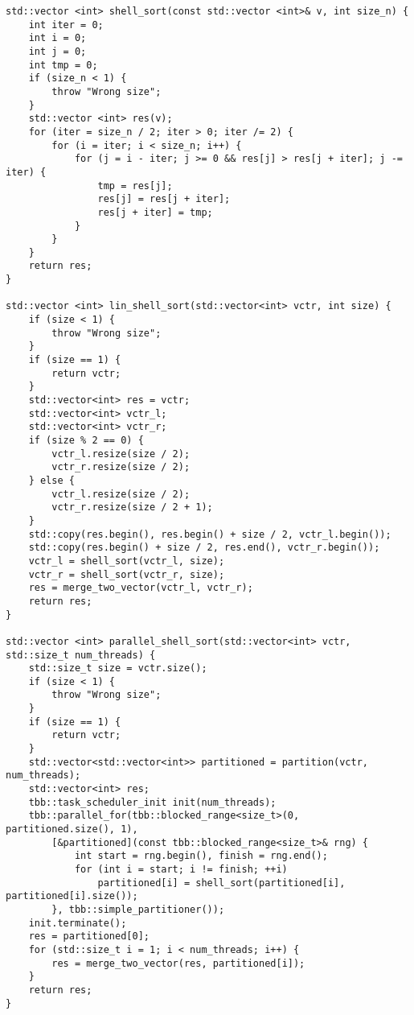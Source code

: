 \documentclass{report}
\begin{document}
\begin{lstlisting}
std::vector <int> shell_sort(const std::vector <int>& v, int size_n) {
    int iter = 0;
    int i = 0;
    int j = 0;
    int tmp = 0;
    if (size_n < 1) {
        throw "Wrong size";
    }
    std::vector <int> res(v);
    for (iter = size_n / 2; iter > 0; iter /= 2) {
        for (i = iter; i < size_n; i++) {
            for (j = i - iter; j >= 0 && res[j] > res[j + iter]; j -= iter) {
                tmp = res[j];
                res[j] = res[j + iter];
                res[j + iter] = tmp;
            }
        }
    }
    return res;
}

std::vector <int> lin_shell_sort(std::vector<int> vctr, int size) {
    if (size < 1) {
        throw "Wrong size";
    }
    if (size == 1) {
        return vctr;
    }
    std::vector<int> res = vctr;
    std::vector<int> vctr_l;
    std::vector<int> vctr_r;
    if (size % 2 == 0) {
        vctr_l.resize(size / 2);
        vctr_r.resize(size / 2);
    } else {
        vctr_l.resize(size / 2);
        vctr_r.resize(size / 2 + 1);
    }
    std::copy(res.begin(), res.begin() + size / 2, vctr_l.begin());
    std::copy(res.begin() + size / 2, res.end(), vctr_r.begin());
    vctr_l = shell_sort(vctr_l, size);
    vctr_r = shell_sort(vctr_r, size);
    res = merge_two_vector(vctr_l, vctr_r);
    return res;
}

std::vector <int> parallel_shell_sort(std::vector<int> vctr, std::size_t num_threads) {
    std::size_t size = vctr.size();
    if (size < 1) {
        throw "Wrong size";
    }
    if (size == 1) {
        return vctr;
    }
    std::vector<std::vector<int>> partitioned = partition(vctr, num_threads);
    std::vector<int> res;
    tbb::task_scheduler_init init(num_threads);
    tbb::parallel_for(tbb::blocked_range<size_t>(0, partitioned.size(), 1),
        [&partitioned](const tbb::blocked_range<size_t>& rng) {
            int start = rng.begin(), finish = rng.end();
            for (int i = start; i != finish; ++i)
                partitioned[i] = shell_sort(partitioned[i], partitioned[i].size());
        }, tbb::simple_partitioner());
    init.terminate();
    res = partitioned[0];
    for (std::size_t i = 1; i < num_threads; i++) {
        res = merge_two_vector(res, partitioned[i]);
    }
    return res;
}

\end{lstlisting}
\end{document}
